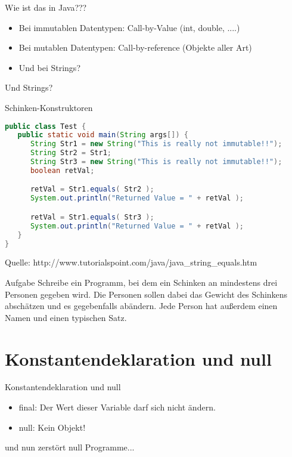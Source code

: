 \documentclass[18pt]{beamer}
\begin{document}
\begin{frame}{Wie ist das in Java???}
\begin{itemize}
 \item Bei immutablen Datentypen: Call-by-Value (int, double, ....)
 \pause
 \item Bei mutablen Datentypen: Call-by-reference (Objekte aller Art)
 \pause
 \item Und bei Strings?
\end{itemize}

\end{frame}


\begin{frame}[fragile]{Und Strings?}
\begin{exampleblock}{Schinken-Konstruktoren}
\begin{lstlisting}[language=java] 
public class Test {
   public static void main(String args[]) {
      String Str1 = new String("This is really not immutable!!");
      String Str2 = Str1;
      String Str3 = new String("This is really not immutable!!");
      boolean retVal;

      retVal = Str1.equals( Str2 );
      System.out.println("Returned Value = " + retVal );

      retVal = Str1.equals( Str3 );
      System.out.println("Returned Value = " + retVal );
   }
}
\end{lstlisting}
\end{exampleblock}
\footnotesize Quelle: http://www.tutorialspoint.com/java/java\_string\_equals.htm
\end{frame}

\begin{frame}{Aufgabe}
 Schreibe ein Programm, bei dem ein Schinken an mindestens drei Personen gegeben wird. 
 Die Personen sollen dabei das Gewicht des Schinkens abschätzen und es gegebenfalls abändern.
 Jede Person hat außerdem einen Namen und einen typischen Satz.
\end{frame}


\section{Konstantendeklaration und null}
\begin{frame}{Konstantendeklaration und null}
\begin{itemize}
 \item final: Der Wert dieser Variable darf sich nicht ändern.
 \item null: Kein Objekt!
\end{itemize}
\pause
und nun zerstört null Programme...
\end{frame}
\end{document}
